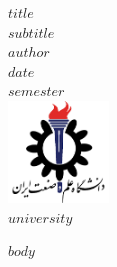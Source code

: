 \documentclass{article}
\begin{document}
\begin{titlepage}
    \centering

    \vspace*{2cm}
    {\Huge \textbf{$title$}} \\[1cm]
    
    {\LARGE $subtitle$} \\[2cm]
    
    {\Large \textbf{$author$}} \\[0.5cm]
    
    {\large $date$} \\[4cm]
    
    {\large $semester$} \\[2cm]
    
    \includegraphics[width=0.2\textwidth]{iustlogo.png} \\[0.2cm]
    \textbf{$university$}
\end{titlepage}

$body$
\end{document}
